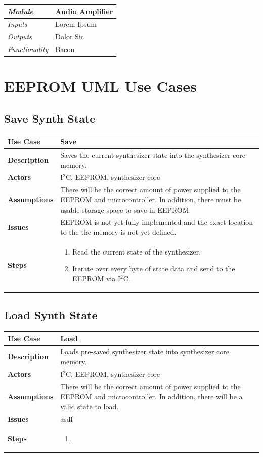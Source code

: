 \documentclass{article}
\begin{document}
\begin{tabular}{|p{1in}|p{5in}|}
\hline
\emph{Module} & Audio Amplifier \\
\hline
\emph{Inputs}& Lorem Ipsum\\
\hline
\emph{Outputs}& Dolor Sic \\ 
\hline
\emph{Functionality}& Bacon\\
\hline
\end{tabular}

\section{EEPROM UML Use Cases}

\subsection{Save Synth State}
\begin{tabular}{|p{1in}|p{5in}|}
\hline
\textbf{Use Case} & Save\\
\hline
\textbf{Description} & Saves the current synthesizer state into the synthesizer core memory.\\
\hline
\textbf{Actors} & I$^2$C, EEPROM, synthesizer core\\
\hline
\textbf{Assumptions} & There will be the correct amount of power supplied to the EEPROM and microcontroller.  In addition, there must be usable storage space to save in EEPROM.\\
\hline
\textbf{Issues} & EEPROM is not yet fully implemented and the exact location to the the memory is not yet defined.\\
\hline
\textbf{Steps} & \begin{enumerate}
\item Read the current state of the synthesizer.
\item Iterate over every byte of state data and send to the EEPROM via I$^2$C.
\end{enumerate}\\
\hline
\end{tabular}

\subsection{Load Synth State}
\begin{tabular}{|p{1in}|p{5in}|}
\hline
\textbf{Use Case} & Load\\
\hline
\textbf{Description} & Loads pre-saved synthesizer state into synthesizer core memory.\\
\hline
\textbf{Actors} & I$^{2}$C, EEPROM, synthesizer core\\
\hline
\textbf{Assumptions} & There will be the correct amount of power supplied to the EEPROM and microcontroller.  In addition, there will be a valid state to load.\\
\hline
\textbf{Issues} & asdf\\
\hline
\textbf{Steps} & \begin{enumerate}
\item
\end{enumerate}\\
\hline
\end{tabular}
\end{document}
